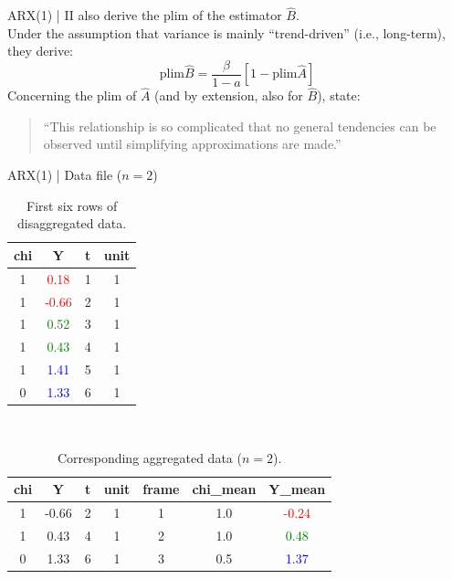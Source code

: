 \documentclass[aspectratio=169, xcolor=dvipsnames]{beamer} %
\begin{document}

\begin{frame}{ARX(1) | \textcite{hickman_effects_1972} II}
    \textcite{hickman_effects_1972} also derive the plim of the estimator $\hat{B}$.\\
    \bigskip
    Under the assumption that variance is mainly ``trend-driven'' (i.e., long-term), they derive:
    \begin{equation}
        \text{plim} \hat{B} = \frac{\beta}{1 - a}[1 - \text{plim}\hat{A}]
    \end{equation}
    Concerning the plim of $\hat{A}$ (and by extension, also for $\hat{B}$), \textcite{hickman_effects_1972} state: \\
    \bigskip
    \begin{quote}
        ``This relationship is so complicated that no general tendencies can be observed until simplifying approximations are made.''
    \end{quote}
\end{frame}


\begin{frame}{ARX(1) | Data file ($n = 2$)}
    \footnotesize
    \begin{table}[]
        \centering
        \begin{tabular}{cccc}
            \toprule
            chi & Y & t & unit \\
            \midrule
            1 & \textcolor{red}{0.18} & 1 & 1 \\
            1 & \textcolor{red}{-0.66} & 2 & 1 \\
            1 & \textcolor{green}{0.52} & 3 & 1 \\
            1 & \textcolor{green}{0.43} & 4 & 1 \\
            1 & \textcolor{blue}{1.41} & 5 & 1 \\
            0 & \textcolor{blue}{1.33} & 6 & 1 \\
            \bottomrule
        \end{tabular}
        \caption{First six rows of disaggregated data.}
    \end{table} \\
    \bigskip
    \begin{table}[ht]
        \centering
        \begin{tabularx}{.6\linewidth}{ccccccc}
            \toprule
            chi & Y & t & unit & frame & chi\_mean & Y\_mean \\
            \midrule
            1 & -0.66 & 2 & 1 & 1 & 1.0 & \textcolor{red}{-0.24} \\
            1 & 0.43 & 4 & 1 & 2 & 1.0 & \textcolor{green}{0.48}\\
            0 & 1.33 & 6 & 1 & 3 & 0.5 & \textcolor{blue}{1.37} \\
            \bottomrule
        \end{tabularx}
        \caption{Corresponding aggregated data ($n = 2$).}
    \end{table}
\end{frame}
\end{document}
